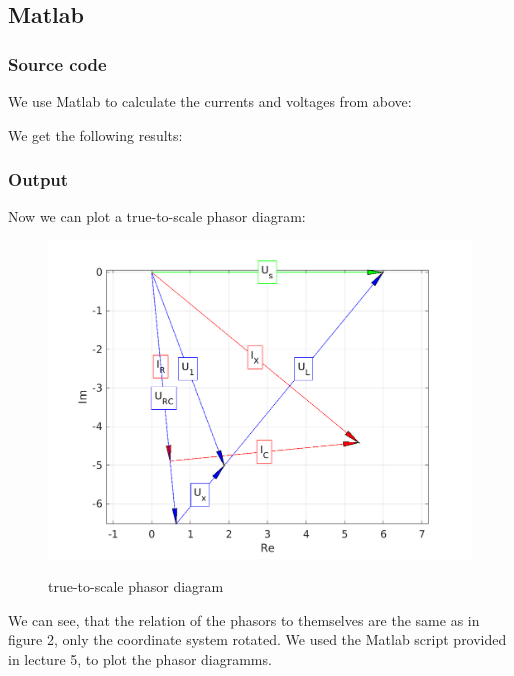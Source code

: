 \documentclass[a4paper]{article}
\begin{document}
\subsection{Matlab}
\subsubsection{Source code}
We use Matlab to calculate the currents and voltages from above:

We get the following results:
\clearpage
\subsubsection{Output}


Now we can plot a true-to-scale phasor diagram:

\begin{figure}[h!]
	\centering
	\includegraphics{./Figures/true_to_scale_phasor_diagram.png}
	\label{phasor_dia_2}
	\caption{true-to-scale phasor diagram}
\end{figure}

We can see, that the relation of the phasors to themselves are the same as in figure 2, only the
coordinate system rotated. We used the Matlab script provided in lecture 5, to plot the phasor
diagramms.

\clearpage
\end{document}
